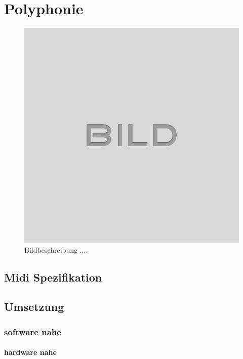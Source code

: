
\chapter{Polyphonie}\label{chap.polyphonie}

\begin{figure}[H]
	\centering
	\includegraphics[width=\textwidth]{images/idle.png}
	\caption{Bildbeschreibung ....}
	\label{fig.fm_}
\end{figure}

\section{Midi Spezifikation}\label{sect.fm_definition}

\section{Umsetzung}\label{sect.fm_DTP2}


\subsection{software nahe}\label{sect.fm_neu}
\subsubsection{hardware nahe}\label{sect.fm_neu.ansatz}
